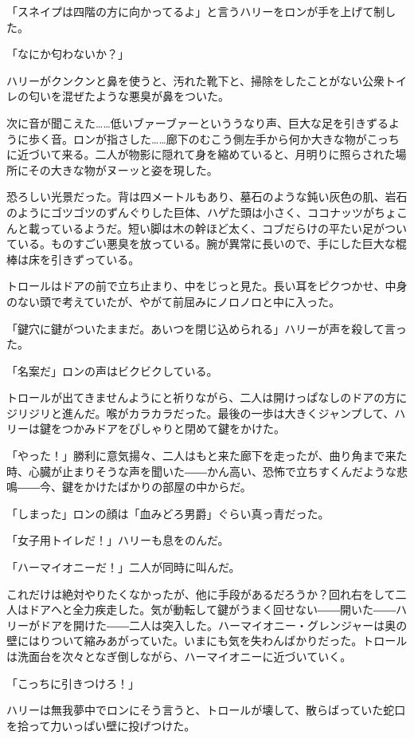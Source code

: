 \documentclass[10pt,a4paper]{article}
\begin{document}
\begin{CJK}{UTF8}{min}
「スネイプは四階の方に向かってるよ」と言うハリーをロンが手を上げて制した。

「なにか匂わないか？」

ハリーがクンクンと鼻を使うと、汚れた靴下と、掃除をしたことがない公衆トイレの匂いを混ぜたような悪臭が鼻をついた。

次に音が聞こえた……低いブァーブァーといううなり声、巨大な足を引きずるように歩く音。ロンが指さした……廊下のむこう側左手から何か大きな物がこっちに近づいて来る。二人が物影に隠れて身を縮めていると、月明りに照らされた場所にその大きな物がヌーッと姿を現した。

恐ろしい光景だった。背は四メートルもあり、墓石のような鈍い灰色の肌、岩石のようにゴツゴツのずんぐりした巨体、ハゲた頭は小さく、ココナッツがちょこんと載っているようだ。短い脚は木の幹ほど太く、コブだらけの平たい足がついている。ものすごい悪臭を放っている。腕が異常に長いので、手にした巨大な棍棒は床を引きずっている。

トロールはドアの前で立ち止まり、中をじっと見た。長い耳をピクつかせ、中身のない頭で考えていたが、やがて前屈みにノロノロと中に入った。

「鍵穴に鍵がついたままだ。あいつを閉じ込められる」ハリーが声を殺して言った。

「名案だ」ロンの声はビクビクしている。

トロールが出てきませんようにと祈りながら、二人は開けっぱなしのドアの方にジリジリと進んだ。喉がカラカラだった。最後の一歩は大きくジャンプして、ハリーは鍵をつかみドアをぴしゃりと閉めて鍵をかけた。

「やった！」勝利に意気揚々、二人はもと来た廊下を走ったが、曲り角まで来た時、心臓が止まりそうな声を聞いた――かん高い、恐怖で立ちすくんだような悲鳴――今、鍵をかけたばかりの部屋の中からだ。

「しまった」ロンの顔は「血みどろ男爵」ぐらい真っ青だった。

「女子用トイレだ！」ハリーも息をのんだ。

「ハーマイオニーだ！」二人が同時に叫んだ。

これだけは絶対やりたくなかったが、他に手段があるだろうか？回れ右をして二人はドアへと全力疾走した。気が動転して鍵がうまく回せない――開いた――ハリーがドアを開けた――二人は突入した。ハーマイオニー・グレンジャーは奥の壁にはりついて縮みあがっていた。いまにも気を失わんばかりだった。トロールは洗面台を次々となぎ倒しながら、ハーマイオニーに近づいていく。

「こっちに引きつけろ！」

ハリーは無我夢中でロンにそう言うと、トロールが壊して、散らばっていた蛇口を拾って力いっぱい壁に投げつけた。


\end{CJK}
\end{document}
